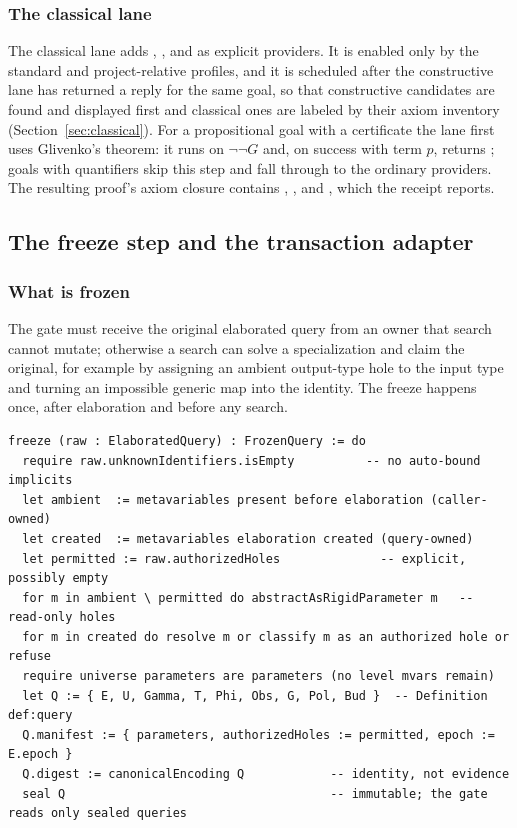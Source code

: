 \subsubsection{The classical lane}

The classical lane adds , , and  as explicit providers. It is enabled only by the standard and project-relative profiles, and it is scheduled after the constructive lane has returned a reply for the same goal, so that constructive candidates are found and displayed first and classical ones are labeled by their axiom inventory (Section~\ref{sec:classical}). For a propositional goal with a certificate the lane first uses Glivenko's theorem: it runs  on $\neg\neg G$ and, on success with term $p$, returns ; goals with quantifiers skip this step and fall through to the ordinary providers\cite{forge}. The resulting proof's axiom closure contains , , and , which the receipt reports.

\subsection{The freeze step and the transaction adapter}\label{alg:freeze}

\subsubsection{What is frozen}

The gate must receive the original elaborated query from an owner that search cannot mutate; otherwise a search can solve a specialization and claim the original, for example by assigning an ambient output-type hole to the input type and turning an impossible generic map into the identity. The freeze happens once, after elaboration and before any search.
\begin{lstlisting}
freeze (raw : ElaboratedQuery) : FrozenQuery := do
  require raw.unknownIdentifiers.isEmpty          -- no auto-bound implicits
  let ambient  := metavariables present before elaboration (caller-owned)
  let created  := metavariables elaboration created (query-owned)
  let permitted := raw.authorizedHoles              -- explicit, possibly empty
  for m in ambient \ permitted do abstractAsRigidParameter m   -- read-only holes
  for m in created do resolve m or classify m as an authorized hole or refuse
  require universe parameters are parameters (no level mvars remain)
  let Q := { E, U, Gamma, T, Phi, Obs, G, Pol, Bud }  -- Definition def:query
  Q.manifest := { parameters, authorizedHoles := permitted, epoch := E.epoch }
  Q.digest := canonicalEncoding Q            -- identity, not evidence
  seal Q                                     -- immutable; the gate reads only sealed queries
\end{lstlisting}

